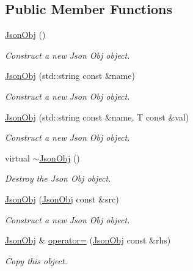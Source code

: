 \subsection*{Public Member Functions}
\begin{DoxyCompactItemize}
\item 
\mbox{\label{class_json_obj_af39c9c8cdef43953ef8c3cc233681c7c}} 
\hyperlink{class_json_obj_af39c9c8cdef43953ef8c3cc233681c7c}{Json\+Obj} ()
\begin{DoxyCompactList}\small\item\em Construct a new Json Obj object. \end{DoxyCompactList}\item 
\hyperlink{class_json_obj_af6841346388fac1a1d07f804412ef1ae}{Json\+Obj} (std\+::string const \&name)
\begin{DoxyCompactList}\small\item\em Construct a new Json Obj object. \end{DoxyCompactList}\item 
\hyperlink{class_json_obj_a850a00361030aaa5516b7f4ba788b475}{Json\+Obj} (std\+::string const \&name, T const \&val)
\begin{DoxyCompactList}\small\item\em Construct a new Json Obj object. \end{DoxyCompactList}\item 
\mbox{\label{class_json_obj_a15ab9334beda2faa9faee4edc979bbc9}} 
virtual \hyperlink{class_json_obj_a15ab9334beda2faa9faee4edc979bbc9}{$\sim$\+Json\+Obj} ()
\begin{DoxyCompactList}\small\item\em Destroy the Json Obj object. \end{DoxyCompactList}\item 
\hyperlink{class_json_obj_a74753a7e79120793f5b47a5257d5ffb2}{Json\+Obj} (\hyperlink{class_json_obj}{Json\+Obj} const \&src)
\begin{DoxyCompactList}\small\item\em Construct a new Json Obj object. \end{DoxyCompactList}\item 
\hyperlink{class_json_obj}{Json\+Obj} \& \hyperlink{class_json_obj_a8cfe5f37bfa374057419efb1f4cc644c}{operator=} (\hyperlink{class_json_obj}{Json\+Obj} const \&rhs)
\begin{DoxyCompactList}\small\item\em Copy this object. \end{DoxyCompactList}\item 

\end{DoxyCompactItemize}
